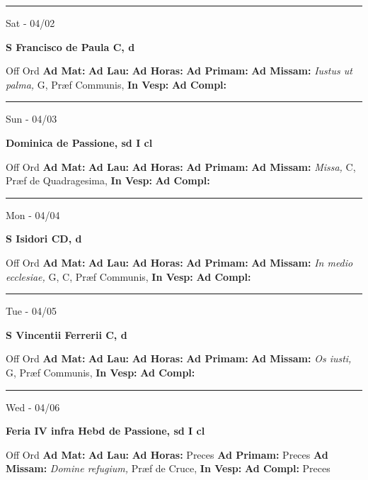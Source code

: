 \documentclass[letterpaper, 10pt]{article}
\begin{document}
\hrule
\begin{center}
Sat - 04/02
\end{center}\textbf{ \large S Francisco de Paula C, \textnormal{\normalsize d}}
\begin{justify}
Off Ord
\textbf{Ad Mat: }
\textbf{Ad Lau: }
\textbf{Ad Horas: }
\textbf{Ad Primam: }
\textbf{Ad Missam:} \textit{Iustus ut palma, } G, Præf Communis, 
\textbf{In Vesp: }
\textbf{Ad Compl: }\end{justify}



\hrule
\begin{center}
Sun - 04/03
\end{center}\textbf{ \large Dominica de Passione, \textnormal{\normalsize sd I cl}}
\begin{justify}
Off Ord
\textbf{Ad Mat: }
\textbf{Ad Lau: }
\textbf{Ad Horas: }
\textbf{Ad Primam: }
\textbf{Ad Missam:} \textit{Missa, } C, Præf de Quadragesima, 
\textbf{In Vesp: }
\textbf{Ad Compl: }\end{justify}



\hrule
\begin{center}
Mon - 04/04
\end{center}\textbf{ \large S Isidori CD, \textnormal{\normalsize d}}
\begin{justify}
Off Ord
\textbf{Ad Mat: }
\textbf{Ad Lau: }
\textbf{Ad Horas: }
\textbf{Ad Primam: }
\textbf{Ad Missam:} \textit{In medio ecclesiae, } G, C, Præf Communis, 
\textbf{In Vesp: }
\textbf{Ad Compl: }\end{justify}



\hrule
\begin{center}
Tue - 04/05
\end{center}\textbf{ \large S Vincentii Ferrerii C, \textnormal{\normalsize d}}
\begin{justify}
Off Ord
\textbf{Ad Mat: }
\textbf{Ad Lau: }
\textbf{Ad Horas: }
\textbf{Ad Primam: }
\textbf{Ad Missam:} \textit{Os iusti, } G, Præf Communis, 
\textbf{In Vesp: }
\textbf{Ad Compl: }\end{justify}



\hrule
\begin{center}
Wed - 04/06
\end{center}\textbf{ \large Feria IV infra Hebd de Passione, \textnormal{\normalsize sd I cl}}
\begin{justify}
Off Ord
\textbf{Ad Mat: }
\textbf{Ad Lau: }
\textbf{Ad Horas: }Preces
\textbf{Ad Primam: }Preces
\textbf{Ad Missam:} \textit{Domine refugium, } Præf de Cruce, 
\textbf{In Vesp: }
\textbf{Ad Compl: }Preces\end{justify}
\end{document}
